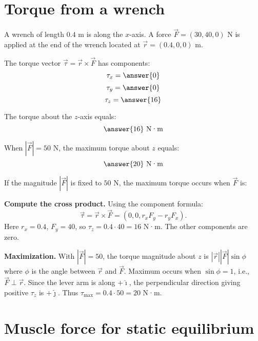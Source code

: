 \documentclass{ximera}
\begin{document}
\section*{Torque from a wrench}

\begin{problem}
A wrench of length \(0.4\) m is along the \(x\)-axis. A force \(\vec F=(30,40,0)\) N is applied at the end of the wrench located at \(\vec r=(0.4,0,0)\) m.

The torque vector \(\vec\tau=\vec r\times\vec F\) has components:
\[
\tau_x = \answer{0}
\]
\[
\tau_y = \answer{0}
\]
\[
\tau_z = \answer{16}
\]

The torque about the \(z\)-axis equals:
\[
\answer{16} \text{ N·m}
\]

When \(|\vec F|=50\) N, the maximum torque about \(z\) equals:
\[
\answer{20} \text{ N·m}
\]

If the magnitude \(|\vec F|\) is fixed to \(50\) N, the maximum torque occurs when \(\vec F\) is:
\begin{multipleChoice}
\end{multipleChoice}
\end{problem}

\begin{solution}
\textbf{Compute the cross product.} Using the component formula:
\[
\vec\tau = \vec r \times \vec F = (0,0,r_x F_y - r_y F_x).
\]
Here \(r_x=0.4\), \(F_y=40\), so \(\tau_z = 0.4 \cdot 40 = 16\) N·m. The other components are zero.

\textbf{Maximization.} With \(|\vec F|=50\), the torque magnitude about \(z\) is \(|\vec r||\vec F|\sin\phi\) where \(\phi\) is the angle between \(\vec r\) and \(\vec F\). Maximum occurs when \(\sin\phi=1\), i.e., \(\vec F \perp \vec r\). Since the lever arm is along \(+\hat\imath\), the perpendicular direction giving positive \(\tau_z\) is \(+\hat\jmath\). Thus \(\tau_{\max}=0.4 \cdot 50 = 20\) N·m.
\end{solution}

\section*{Muscle force for static equilibrium}
\end{document}
